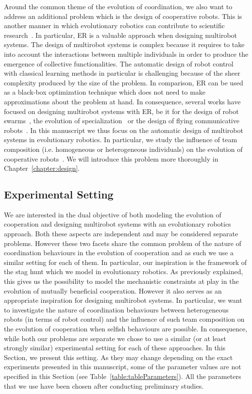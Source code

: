     Around the common theme of the evolution of coordination, we also want to address an additional problem which is the design of cooperative robots. This is another manner in which evolutionary robotics can contribute to scientific research~\parencite{Trianni2014b, Doncieux2015a}. In particular, ER is a valuable approach when designing multirobot systems. The design of multirobot systems is complex because it requires to take into account the interactions between multiple individuals in order to produce the emergence of collective functionalities. The automatic design of robot control with classical learning methods in particular is challenging because of the sheer complexity produced by the size of the problem. In comparison, ER can be used as a black-box optimization technique which does not need to make approximations about the problem at hand. In consequence, several works have focused on designing multirobot systems with ER, be it for the design of robot swarms~\parencite{Baldassarre2007}, the evolution of specialization~\parencite{Ferrante2015} or the design of flying communicative robots~\parencite{Hauert2014}. In this manuscript we thus focus on the automatic design of multirobot systems in evolutionary robotics. In particular, we study the influence of team composition (i.e. homogeneous or heterogeneous individuals) on the evolution of cooperative robots~\parencite{Waibel2009}. We will introduce this problem more thoroughly in Chapter~\ref{chapter:design}.


  \subsection{Experimental Setting}

    We are interested in the dual objective of both modeling the evolution of cooperation and designing multirobot systems with an evolutionary robotics approach. Both these aspects are independent and may be considered separate problems. However these two facets share the common problem of the nature of coordination behaviours in the evolution of cooperation and as such we use a similar setting for each of them. In particular, our inspiration is the framework of the stag hunt which we model in evolutionary robotics. As previously explained, this gives us the possibility to model the mechanistic constraints at play in the evolution of mutually beneficial cooperation. However it also serves as an appropriate inspiration for designing multirobot systems. In particular, we want to investigate the nature of coordination behaviours between heterogeneous robots (in terms of robot control) and the influence of such team composition on the evolution of cooperation when selfish behaviours are possible. In consequence, while both our problems are separate we chose to use a similar (or at least strongly similar) experimental setting for each of these approaches. In this Section, we present this setting. As they may change depending on the exact experiments presented in this manuscript, some of the parameter values are not specified in this Section (see Table~\ref{table:tableParameters}). All the parameters that we use have been chosen after conducting preliminary studies.

